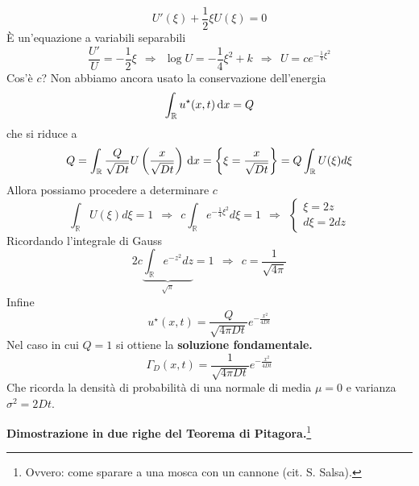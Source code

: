 \begin{equation*}
    U'(\xi) +\frac{1}{2} \xi U(\xi) =0
\end{equation*}
È un'equazione a variabili separabili
\begin{equation*}
    \frac{U'}{U} =-\frac{1}{2} \xi \ \ \Rightarrow \ \ \log U=-\frac{1}{4} \xi ^{2} +k\ \ \Rightarrow \ \ U=ce^{-\frac{1}{4} \xi ^{2}}
\end{equation*}
Cos'è $c$? Non abbiamo ancora usato la conservazione dell'energia
\begin{equation*}
    \int _{\mathbb{R}} u^{\star }(x,t) \,\mathrm d x=Q
\end{equation*}
che si riduce a
\begin{equation*}
    Q = \int _{\mathbb{R}}\frac{Q}{\sqrt{Dt}} U\left(\frac{x}{\sqrt{Dt}}\right) \,\mathrm d x=\left\{\xi=\frac{x}{\sqrt{Dt}}\right\} = Q\int _{\mathbb{R}} U(\xi) d\xi
\end{equation*}
Allora possiamo procedere a determinare $c$
\begin{equation*}
    \int _{\mathbb{R}} U(\xi) d\xi =1\ \ \Rightarrow \ \ c\int _{\mathbb{R}} e^{-\frac{1}{4} \xi ^{2}} d\xi =1\ \ \Rightarrow \ \ \begin{cases}
        \xi =2z \\
        d\xi =2dz
    \end{cases}
\end{equation*}
Ricordando l'integrale di Gauss
\begin{equation*}
    2c\underbrace{\int _{\mathbb{R}} e^{-z^{2}} dz}_{\sqrt{\pi }} =1\ \ \Rightarrow \ \ c=\frac{1}{\sqrt{4\pi }}
\end{equation*}
Infine
\begin{equation*}
    \boxed{u^{\star }(x,t) =\frac{Q}{\sqrt{4\pi Dt}} e^{-\frac{x^{2}}{4Dt}}}
\end{equation*}
Nel caso in cui $Q=1$ si ottiene la \textbf{soluzione fondamentale.}
\begin{equation*}
    \boxed{\Gamma _{D}(x,t) =\frac{1}{\sqrt{4\pi Dt}} e^{-\frac{x^{2}}{4Dt}}}
\end{equation*}
Che ricorda la densità di probabilità di una normale di media $\mu=0$ e varianza $\sigma ^2 =2Dt$.

\textbf{Dimostrazione in due righe del Teorema di Pitagora.}\footnote{Ovvero: come sparare a una mosca con un cannone (cit. S. Salsa).}

